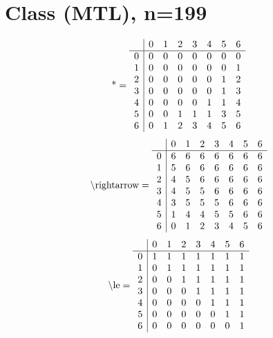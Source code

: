 \documentclass[11pt]{article}
\begin{document}
\section{Class (MTL), n=199}
\[\text{*} = 
\begin{array}{r | r r r r r r r}
 & 0 & 1 & 2 & 3 & 4 & 5 & 6 \\ \hline
0 & 0 & 0 & 0 & 0 & 0 & 0 & 0 \\
1 & 0 & 0 & 0 & 0 & 0 & 0 & 1 \\
2 & 0 & 0 & 0 & 0 & 0 & 1 & 2 \\
3 & 0 & 0 & 0 & 0 & 0 & 1 & 3 \\
4 & 0 & 0 & 0 & 0 & 1 & 1 & 4 \\
5 & 0 & 0 & 1 & 1 & 1 & 3 & 5 \\
6 & 0 & 1 & 2 & 3 & 4 & 5 & 6 \\
\end{array}
\]
\[\text{\textbackslash rightarrow} = 
\begin{array}{r | r r r r r r r}
 & 0 & 1 & 2 & 3 & 4 & 5 & 6 \\ \hline
0 & 6 & 6 & 6 & 6 & 6 & 6 & 6 \\
1 & 5 & 6 & 6 & 6 & 6 & 6 & 6 \\
2 & 4 & 5 & 6 & 6 & 6 & 6 & 6 \\
3 & 4 & 5 & 5 & 6 & 6 & 6 & 6 \\
4 & 3 & 5 & 5 & 5 & 6 & 6 & 6 \\
5 & 1 & 4 & 4 & 5 & 5 & 6 & 6 \\
6 & 0 & 1 & 2 & 3 & 4 & 5 & 6 \\
\end{array}
\]
\[\text{\textbackslash le} = 
\begin{array}{r | r r r r r r r}
 & 0 & 1 & 2 & 3 & 4 & 5 & 6 \\ \hline
0 & 1 & 1 & 1 & 1 & 1 & 1 & 1 \\
1 & 0 & 1 & 1 & 1 & 1 & 1 & 1 \\
2 & 0 & 0 & 1 & 1 & 1 & 1 & 1 \\
3 & 0 & 0 & 0 & 1 & 1 & 1 & 1 \\
4 & 0 & 0 & 0 & 0 & 1 & 1 & 1 \\
5 & 0 & 0 & 0 & 0 & 0 & 1 & 1 \\
6 & 0 & 0 & 0 & 0 & 0 & 0 & 1 \\
\end{array}
\]
\end{document}
